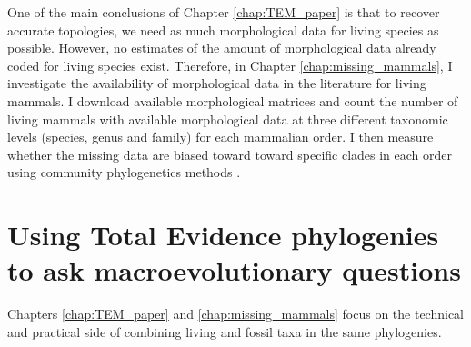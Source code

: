 One of the main conclusions of Chapter \ref{chap:TEM_paper} is that to recover accurate topologies, we need as much morphological data for living species as possible.
However, no estimates of the amount of morphological data already coded for living species exist.
Therefore, in Chapter \ref{chap:missing_mammals}, I investigate the availability of morphological data in the literature for living mammals.
I download available morphological matrices and count the number of living mammals with available morphological data at three different taxonomic levels (species, genus and family) for each mammalian order.
I then measure whether the missing data are biased toward toward specific clades in each order using community phylogenetics methods \citep{webb2002phylogenies}.


\section{Using Total Evidence phylogenies to ask macroevolutionary questions}
Chapters \ref{chap:TEM_paper} and \ref{chap:missing_mammals} focus on the technical and practical side of combining living and fossil taxa in the same phylogenies.



